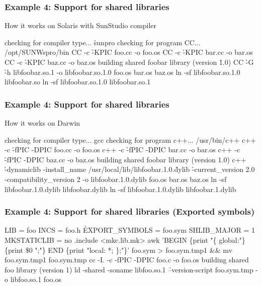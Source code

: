 \documentclass[hyperref={colorlinks=true}]{beamer}
\begin{document}
\begin{frame}[fragile]
  \frametitle{Example 4: Support for shared libraries}

  \begin{block}{How it works on Solaris with SunStudio compiler}
\begin{CodeNoLabel}
checking for compiler type... \h{sunpro}
checking for program CC... /opt/SUNWspro/bin
CC -c \h{-KPIC} foo.cc -o foo.os
CC -c \h{-KPIC} bar.cc -o bar.os
CC -c \h{-KPIC} baz.cc -o baz.os
building shared foobar library (version \h{1.0})
CC \h{-G} \h{-h libfoobar.so.1}
   -o libfoobar.so.1.0  foo.os bar.os baz.os
ln -sf libfoobar.so.1.0 libfoobar.so
ln -sf libfoobar.so.1.0 libfoobar.so.1
\prompt{\$}
\end{CodeNoLabel}
  \end{block}
\end{frame}

\begin{frame}[fragile]
  \frametitle{Example 4: Support for shared libraries}

  \begin{block}{How it works on Darwin}
\begin{CodeNoLabel}
checking for compiler type... gcc
checking for program c++... /usr/bin/c++
c++    -c \h{-fPIC -DPIC} foo.cc -o foo.os
c++    -c \h{-fPIC -DPIC} bar.cc -o bar.os
c++    -c \h{-fPIC -DPIC} baz.cc -o baz.os
building shared foobar library (version 1.0)
c++ \h{-dynamiclib -install\_name}
   /usr/local/lib/libfoobar.1.0.\h{dylib}
   \h{-current\_version 2.0 -compatibility\_version 2} 
   -o libfoobar.1.0.dylib  foo.os bar.os baz.os
ln -sf libfoobar.1.0.dylib libfoobar.dylib
ln -sf libfoobar.1.0.dylib libfoobar.1.dylib
\prompt{\$}
\end{CodeNoLabel}
  \end{block}
\end{frame}

\begin{frame}[fragile]
  \frametitle{Example 4: Support for shared libraries (Exported symbols)}

  \begin{block}{}
\begin{CodeNoLabel}
LIB            = foo
INCS           = foo.h
\h{EXPORT\_SYMBOLS} = foo.sym
SHLIB_MAJOR    = 1
MKSTATICLIB    = no
.include <mkc.lib.mk>
awk 'BEGIN \{print "\{ global:"\}  \{print \$0 ";"\}
     END \{print "local: *; \};"\}' foo.sym
     > foo.sym.tmp1 && mv foo.sym.tmp1 foo.sym.tmp
cc    -I.  -c -fPIC -DPIC foo.c -o foo.os
building shared foo library (version 1)
ld -shared -soname libfoo.so.1
   \h{--version-script foo.sym.tmp} -o libfoo.so.1  foo.os
\prompt{\$}
\end{CodeNoLabel}
  \end{block}
\end{frame}
\end{document}
